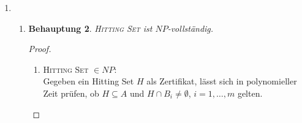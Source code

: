 \documentclass[a4paper]{scrartcl}
\newtheorem*{proposition}{Behauptung}
\newcommand{\Oh}{\mathcal{O}}
\begin{document}
\begin{enumerate}[label=\bfseries \arabic*.]
\begin{enumerate}
\begin{proof}
\begin{enumerate}
                Es gilt also \textsc{3D-Matching} $\leq_p$
                \textsc{4D-Matching}, letzteres ist also mindestens so schwer
                wie ersteres. Da wir von \textsc{3D-Matching} wissen, dass es
                $NP$-vollständig ist, folgt, dass \textsc{4D-Matching}
                $NP$-schwierig ist.

        \end{enumerate}
        Aus i. und ii. folgt, dass \textsc{4D-Matching} $NP$-vollständig ist.
    \end{proof}

    \item
        \begin{proposition}
            \textsc{$k$-Clique} ist für kein festes $k \geq 1$
            $NP$-vollständig, solange $P \neq NP$.
        \end{proposition}
        \begin{proof}
            Wir zeigen, dass \textsc{$k$-Clique} $\in P$, indem wir einen
            Algorithmus angeben, der \textsc{$k$-Clique} in Polynomialzeit
            entscheidet.
            Sei $n = |V|$.
            Dann gibt es $\binom{n}{k} \in \Oh(n^k)$ Subgraphen der Größe $k$.
            In jedem dieser Subgraphen gibt es $\Oh(k^2)$ Kanten, die auf
            Existenz überprüft werden müssen.
            Damit kann \textsc{$k$-Clique} in $\Oh(n^kk^2)$ entschieden werden,
            also in Polynomialzeit, da $k$ fix ist.

            Damit ist \textsc{$k$-Clique} nicht $NP$-vollständig, solange $P \neq NP$.
        \end{proof}

\end{enumerate}

\item %
\begin{enumerate}
    \item
        \begin{proposition}
            \textsc{Hitting Set} ist $NP$-vollständig.
        \end{proposition}
        \begin{proof}
            \hfill \\
            \begin{enumerate}
                \item \textsc{Hitting Set} $\in NP$: \\
                    Gegeben ein Hitting Set $H$ als Zertifikat, lässt sich in
                    polynomieller Zeit prüfen, ob $H \subseteq A$ und $H \cap
                    B_i \neq \emptyset$, $i = 1, \dotsc, m$ gelten.


\end{enumerate}
\end{proof}
\end{enumerate}
\end{enumerate}
\end{document}
